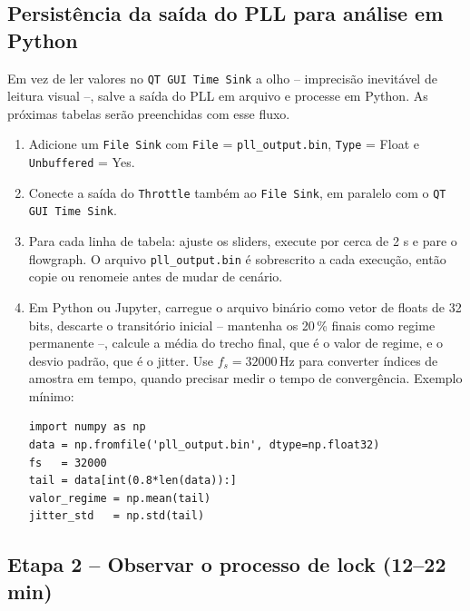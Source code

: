 \documentclass[11pt,a4paper]{article}
\begin{document}
\subsection*{Persistência da saída do PLL para análise em Python}

Em vez de ler valores no \texttt{QT GUI Time Sink} a olho -- imprecisão
inevitável de leitura visual --, salve a saída do PLL em arquivo e processe
em Python. As próximas tabelas serão preenchidas com esse fluxo.

\begin{instrucao}
\begin{enumerate}[label=\arabic*.]
  \item Adicione um \texttt{File Sink} com \texttt{File} =
    \texttt{pll\_output.bin}, \texttt{Type} = Float e \texttt{Unbuffered} = Yes.
  \item Conecte a saída do \texttt{Throttle} também ao \texttt{File Sink}, em
    paralelo com o \texttt{QT GUI Time Sink}.
  \item Para cada linha de tabela: ajuste os sliders, execute por cerca de 2 s
    e pare o flowgraph. O arquivo \texttt{pll\_output.bin} é sobrescrito a
    cada execução, então copie ou renomeie antes de mudar de cenário.
  \item Em Python ou Jupyter, carregue o arquivo binário como vetor de floats
    de 32 bits, descarte o transitório inicial -- mantenha os 20\,\% finais
    como regime permanente --, calcule a média do trecho final, que é o
    valor de regime, e o desvio padrão, que é o jitter. Use $f_s = 32000$\,Hz
    para converter índices de amostra em tempo, quando precisar medir o
    tempo de convergência. Exemplo mínimo:
\begin{verbatim}
import numpy as np
data = np.fromfile('pll_output.bin', dtype=np.float32)
fs   = 32000
tail = data[int(0.8*len(data)):]
valor_regime = np.mean(tail)
jitter_std   = np.std(tail)
\end{verbatim}
\end{enumerate}
\end{instrucao}

\subsection*{Etapa 2 -- Observar o processo de lock (12--22 min)}
\end{document}
